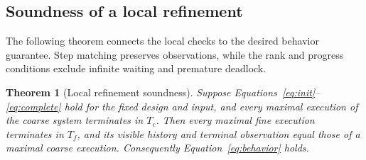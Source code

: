 \documentclass[11pt]{article}
\newtheorem{theorem}{Theorem}
\begin{document}
\subsection{Soundness of a local refinement}
The following theorem connects the local checks to the desired behavior guarantee. Step matching preserves observations, while the rank and progress conditions exclude infinite waiting and premature deadlock.
\begin{theorem}[Local refinement soundness]\label{thm:local}
Suppose Equations~\ref{eq:init}--\ref{eq:complete} hold for the fixed design and input, and every maximal execution of the coarse system terminates in $T_c$. Then every maximal fine execution terminates in $T_f$, and its visible history and terminal observation equal those of a maximal coarse execution. Consequently Equation~\ref{eq:behavior} holds.
\end{theorem}
\end{document}
